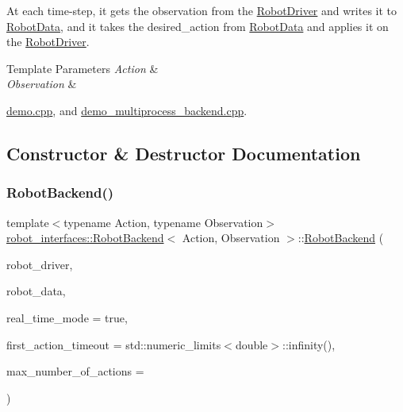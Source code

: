 At each time-\/step, it gets the observation from the \hyperlink{classrobot__interfaces_1_1RobotDriver}{Robot\+Driver} and writes it to \hyperlink{classrobot__interfaces_1_1RobotData}{Robot\+Data}, and it takes the desired\+\_\+action from \hyperlink{classrobot__interfaces_1_1RobotData}{Robot\+Data} and applies it on the \hyperlink{classrobot__interfaces_1_1RobotDriver}{Robot\+Driver}.


\begin{DoxyTemplParams}{Template Parameters}
{\em Action} & \\
\hline
{\em Observation} & \\
\hline
\end{DoxyTemplParams}
\begin{Desc}
\item[Examples\+: ]\par
\hyperlink{demo_8cpp-example}{demo.\+cpp}, and \hyperlink{demo_multiprocess_backend_8cpp-example}{demo\+\_\+multiprocess\+\_\+backend.\+cpp}.\end{Desc}


\subsection{Constructor \& Destructor Documentation}
\mbox{\label{classrobot__interfaces_1_1RobotBackend_af454a09b5d269ed32b0ae2d35abdb833}} 
\subsubsection{\texorpdfstring{Robot\+Backend()}{RobotBackend()}}
{\footnotesize\ttfamily template$<$typename Action, typename Observation$>$ \\
\hyperlink{classrobot__interfaces_1_1RobotBackend}{robot\+\_\+interfaces\+::\+Robot\+Backend}$<$ Action, Observation $>$\+::\hyperlink{classrobot__interfaces_1_1RobotBackend}{Robot\+Backend} (\begin{DoxyParamCaption}\item[{std\+::shared\+\_\+ptr$<$ \hyperlink{classrobot__interfaces_1_1RobotDriver}{Robot\+Driver}$<$ Action, Observation $>$$>$}]{robot\+\_\+driver,  }\item[{std\+::shared\+\_\+ptr$<$ \hyperlink{classrobot__interfaces_1_1RobotData}{Robot\+Data}$<$ Action, Observation $>$$>$}]{robot\+\_\+data,  }\item[{const bool}]{real\+\_\+time\+\_\+mode = {\ttfamily true},  }\item[{const double}]{first\+\_\+action\+\_\+timeout = {\ttfamily std\+:\+:numeric\+\_\+limits$<$double$>$\+:\+:infinity()},  }\item[{const uint32\+\_\+t}]{max\+\_\+number\+\_\+of\+\_\+actions = {} }\end{DoxyParamCaption})\hspace{0.3cm}{\ttfamily [inline]}}


